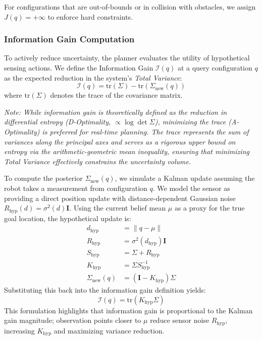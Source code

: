 For configurations that are out-of-bounds or in collision with obstacles, we assign $J(q) = +\infty$ to enforce hard constraints.

\subsubsection{Information Gain Computation}

To actively reduce uncertainty, the planner evaluates the utility of hypothetical sensing actions. We define the Information Gain $\mathcal{I}(q)$ at a query configuration $q$ as the expected reduction in the system's \emph{Total Variance}:
\begin{equation}
    \mathcal{I}(q) = \text{tr}(\Sigma) - \text{tr}(\Sigma_{\text{new}}(q))
\end{equation}
where $\text{tr}(\Sigma)$ denotes the trace of the covariance matrix.

\textit{Note: While information gain is theoretically defined as the reduction in differential entropy (D-Optimality, $\propto \log \det \Sigma$), minimizing the trace (A-Optimality) is preferred for real-time planning. The trace represents the sum of variances along the principal axes and serves as a rigorous upper bound on entropy via the arithmetic-geometric mean inequality, ensuring that minimizing Total Variance effectively constrains the uncertainty volume.}

To compute the posterior $\Sigma_{\text{new}}(q)$, we simulate a Kalman update assuming the robot takes a measurement from configuration $q$. We model the sensor as providing a direct position update with distance-dependent Gaussian noise $R_{\text{hyp}}(d) = \sigma^2(d)\mathbf{I}$. Using the current belief mean $\mu$ as a proxy for the true goal location, the hypothetical update is:
\begin{align}
    d_{\text{hyp}} &= \|q - \mu\| \\
    R_{\text{hyp}} &= \sigma^2(d_{\text{hyp}}) \mathbf{I} \\
    S_{\text{hyp}} &= \Sigma + R_{\text{hyp}} \\
    K_{\text{hyp}} &= \Sigma S_{\text{hyp}}^{-1} \\
    \Sigma_{\text{new}}(q) &= (\mathbf{I} - K_{\text{hyp}}) \Sigma
\end{align}
Substituting this back into the information gain definition yields:
\begin{equation}
    \mathcal{I}(q) = \text{tr}(K_{\text{hyp}} \Sigma)
\end{equation}
This formulation highlights that information gain is proportional to the Kalman gain magnitude; observation points closer to $\mu$ reduce sensor noise $R_{\text{hyp}}$, increasing $K_{\text{hyp}}$ and maximizing variance reduction.

